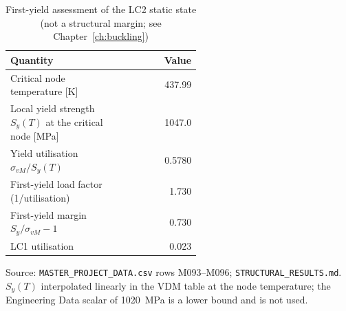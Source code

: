 \begin{table}[htbp]
\centering
\footnotesize
\caption{First-yield assessment of the LC2 static state (not a structural margin; see Chapter~\ref{ch:buckling})}
\label{tab:yield}
\begin{tabular}{>{\raggedright\arraybackslash}p{0.55\linewidth}r}
\toprule
Quantity & Value \\
\midrule
Critical node temperature [K] & 437.99 \\
Local yield strength $S_y(T)$ at the critical node [MPa] & 1047.0 \\
Yield utilisation $\sigma_{vM}/S_y(T)$ & 0.5780 \\
First-yield load factor (1/utilisation) & 1.730 \\
First-yield margin $S_y/\sigma_{vM} - 1$ & 0.730 \\
LC1 utilisation & 0.023 \\
\bottomrule
\end{tabular}
\par\smallskip\parbox{\linewidth}{\footnotesize\raggedright Source: \texttt{MASTER\_PROJECT\_DATA.csv} rows M093--M096; \texttt{STRUCTURAL\_RESULTS.md}. $S_y(T)$ interpolated linearly in the VDM table at the node temperature; the Engineering Data scalar of 1020~MPa is a lower bound and is not used.}
\end{table}

